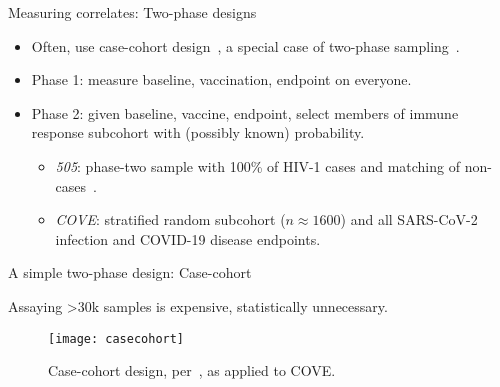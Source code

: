 \documentclass{beamer}
\begin{document}
\begin{frame}[c]{Measuring correlates: Two-phase designs}

\begin{center}
\begin{itemize}
  \itemsep8pt
    \item Often, use case-cohort design~\citep{prentice1986case}, a special
      case of two-phase sampling~\citep{breslow2003large}.
    \item Phase 1: measure baseline, vaccination, endpoint on everyone.
    \item Phase 2: given baseline, vaccine, endpoint, select members of
      immune response subcohort with (possibly known) probability.
      \vspace{-1em}
      \begin{itemize}
        \itemsep4pt
        \item \textit{505}: phase-two sample with 100\% of HIV-1 cases and
          matching of non-cases~\citep[$n = 189$ per][]{janes2017higher}.
        \item \textit{COVE}: stratified random subcohort ($n \approx 1600$) and
          all SARS-CoV-2 infection and COVID-19 disease endpoints.
      \end{itemize}
\end{itemize}
\end{center}

\note{
}

\end{frame}


\begin{frame}[c]{A simple two-phase design: Case-cohort}

Assaying >30k samples is expensive, statistically unnecessary.
\vspace{-1em}
\begin{figure}[H]
  \centering
  \texttt{[image: casecohort]}
  \captionsetup{labelformat=empty}
  \vspace{-1.5em}
  \caption{
    Case-cohort design, per~\citet{prentice1986case}, as applied to COVE.
  }
\end{figure}

\note{
}

\end{frame}

\end{document}

